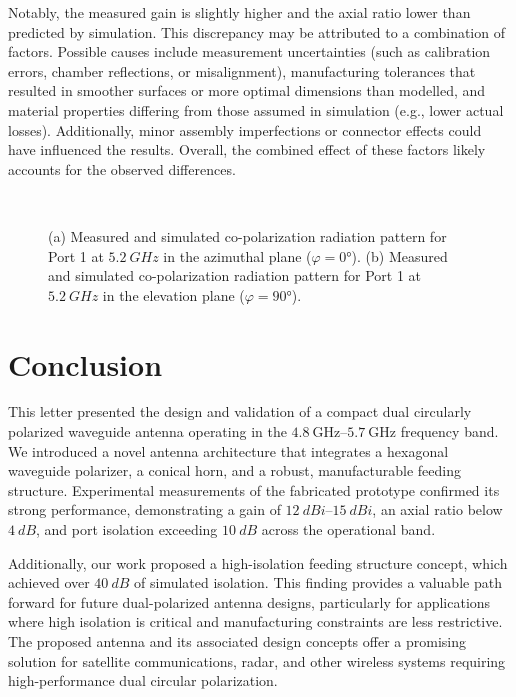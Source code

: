\documentclass[journal,9pt]{IEEEtran}
\newcommand{\frequencyrange}{\qtyrange{4.8}{5.7}{\giga\hertz}}
\begin{document}
Notably, the measured gain is slightly higher and the axial ratio lower than predicted by simulation. This discrepancy may be attributed to a combination of factors. Possible causes include measurement uncertainties (such as calibration errors, chamber reflections, or misalignment), manufacturing tolerances that resulted in smoother surfaces or more optimal dimensions than modelled, and material properties differing from those assumed in simulation (e.g., lower actual losses). Additionally, minor assembly imperfections or connector effects could have influenced the results. Overall, the combined effect of these factors likely accounts for the observed differences.

\begin{figure}[!t]
\centering
{}
\\
\caption{\label{fig:final-radiation}(a) Measured and simulated co-polarization radiation pattern for Port 1 at $\qty{5.2}{GHz}$ in the azimuthal plane ($\varphi=\ang{0}$). (b) Measured and simulated co-polarization radiation pattern for Port 1 at $\qty{5.2}{GHz}$ in the elevation plane ($\varphi=\ang{90}$).}
\end{figure}


\section{Conclusion}
\label{sec:conclusion}

This letter presented the design and validation of a compact dual circularly polarized waveguide antenna operating in the $\frequencyrange$ frequency band. We introduced a novel antenna architecture that integrates a hexagonal waveguide polarizer, a conical horn, and a robust, manufacturable feeding structure. Experimental measurements of the fabricated prototype confirmed its strong performance, demonstrating a gain of $\qtyrange{12}{15}{dBi}$, an axial ratio below $\qty{4}{dB}$, and port isolation exceeding $\qty{10}{dB}$ across the operational band.

Additionally, our work proposed a high-isolation feeding structure concept, which achieved over $\qty{40}{dB}$ of simulated isolation. This finding provides a valuable path forward for future dual-polarized antenna designs, particularly for applications where high isolation is critical and manufacturing constraints are less restrictive. The proposed antenna and its associated design concepts offer a promising solution for satellite communications, radar, and other wireless systems requiring high-performance dual circular polarization.
\end{document}
